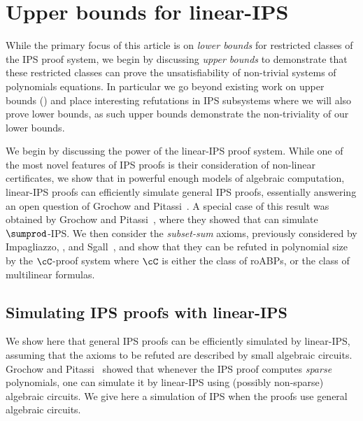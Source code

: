 \documentclass{toc}
\begin{document}
%
%
%
%

\section{Upper bounds for linear-IPS}\label{sec:h-ips:ubs}

While the primary focus of this %
article   %
is on \emph{lower bounds} for restricted classes of the IPS proof system, we begin by discussing \emph{upper bounds} to demonstrate that these restricted classes can prove the unsatisfiability of non-trivial systems of polynomials equations. In particular we go beyond existing work on upper bounds (\cite{GrigorievHirsch03,RazTzameret08a,RazTzameret08b,DBLP:journals/jacm/GrochowP18,LiTW15}) and place interesting refutations in IPS subsystems where we will also prove lower bounds, as such upper bounds demonstrate the non-triviality of our lower bounds.

We begin by discussing the power of the linear-IPS proof system. While one of the most novel features of IPS proofs is their consideration of non-linear certificates, we show that in powerful enough models of algebraic computation, linear-IPS proofs can efficiently simulate general IPS proofs, essentially answering an open question of Grochow and Pitassi~\cite{DBLP:journals/jacm/GrochowP18}. A special case of this result was obtained by Grochow and Pitassi~\cite{DBLP:journals/jacm/GrochowP18}, where they showed that \lIPS can simulate $\sumprod$-IPS\@.  We then consider the \emph{subset-sum} axioms, previously considered by Impagliazzo, \Pudlak, and Sgall~\cite{IPS99}, and show that they can be refuted in polynomial size by the $\cC$-\lIPS proof system where $\cC$ is either the class of roABPs, or the class of multilinear formulas.

\subsection{Simulating IPS proofs with linear-IPS}\label{sec:h-ips:ips=h-ips}

We show here that general IPS proofs can be efficiently simulated by linear-IPS, assuming that the axioms to be refuted are described by small algebraic circuits.  Grochow and Pitassi~\cite{DBLP:journals/jacm/GrochowP18} showed that whenever the IPS proof computes \emph{sparse} polynomials, one can simulate it by linear-IPS using (possibly non-sparse) algebraic circuits.  We give here a simulation of IPS when the proofs use general algebraic circuits.
\end{document}
